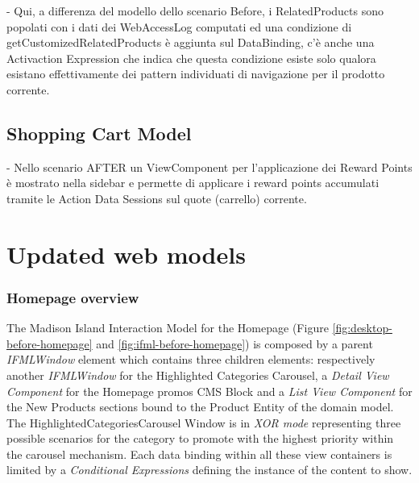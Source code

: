 - Qui, a differenza del modello dello scenario Before, i RelatedProducts sono popolati con i dati dei WebAccessLog computati ed una condizione di getCustomizedRelatedProducts è aggiunta sul DataBinding, c’è anche una Activaction Expression che indica che questa condizione esiste solo qualora esistano effettivamente dei pattern individuati di navigazione per il prodotto corrente.

\subsection{Shopping Cart Model}

- Nello scenario AFTER un ViewComponent per l’applicazione dei Reward Points è mostrato nella sidebar e permette di applicare i reward points accumulati tramite le Action Data Sessions sul quote (carrello) corrente.

\section{Updated web models}


\subsubsection{Homepage overview}

The Madison Island Interaction Model for the Homepage (Figure \ref{fig:desktop-before-homepage} and \ref{fig:ifml-before-homepage}) is composed by a parent \textit{IFMLWindow} element which contains three children elements: respectively another \textit{IFMLWindow} for the Highlighted Categories Carousel, a \textit{Detail View Component} for the Homepage promos CMS Block and a \textit{List View Component} for the New Products sections bound to the Product Entity of the domain model. The HighlightedCategoriesCarousel Window is in \textit{XOR mode} representing three possible scenarios for the category to promote with the highest priority within the carousel mechanism. Each data binding within all these view containers is limited by a \textit{Conditional Expressions} defining the instance of the content to show.

